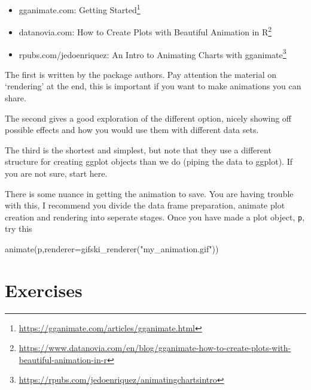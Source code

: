 \documentclass[
  12pt,
  a5paper,
]{book}
\newenvironment{Shaded}{\begin{snugshade}}{\end{snugshade}}
\newcommand{\AttributeTok}[1]{\textcolor[rgb]{0.77,0.63,0.00}{#1}}
\newcommand{\FunctionTok}[1]{\textcolor[rgb]{0.00,0.00,0.00}{#1}}
\newcommand{\NormalTok}[1]{#1}
\newcommand{\StringTok}[1]{\textcolor[rgb]{0.31,0.60,0.02}{#1}}
\DeclareRobustCommand{\href}[2]{#2\footnote{\url{#1}}}
\providecommand{\tightlist}{%
  \setlength{\itemsep}{0pt}\setlength{\parskip}{0pt}}
\begin{document}
\begin{itemize}
\tightlist
\item
  gganimate.com: \href{https://gganimate.com/articles/gganimate.html}{Getting Started}
\item
  datanovia.com: \href{https://www.datanovia.com/en/blog/gganimate-how-to-create-plots-with-beautiful-animation-in-r}{How to Create Plots with Beautiful Animation in R}
\item
  rpubs.com/jedoenriquez: \href{https://rpubs.com/jedoenriquez/animatingchartsintro}{An Intro to Animating Charts with gganimate}
\end{itemize}

The first is written by the package authors. Pay attention the material on `rendering' at the end, this is important if you want to make animations you can share.

The second gives a good exploration of the different option, nicely showing off possible effects and how you would use them with different data sets.

The third is the shortest and simplest, but note that they use a different structure for creating ggplot objects than we do (piping the data to ggplot). If you are not sure, start here.

There is some nuance in getting the animation to save. You are having trouble with this, I recommend you divide the data frame preparation, animate plot creation and rendering into seperate stages. Once you have made a plot object, \texttt{p}, try this

\begin{Shaded}
\begin{Highlighting}[]
\FunctionTok{animate}\NormalTok{(p,}\AttributeTok{renderer=}\FunctionTok{gifski\_renderer}\NormalTok{(}\StringTok{"my\_animation.gif"}\NormalTok{))}
\end{Highlighting}
\end{Shaded}

\hypertarget{exercises-6}{%
\section{Exercises}\label{exercises-6}}
\end{document}

